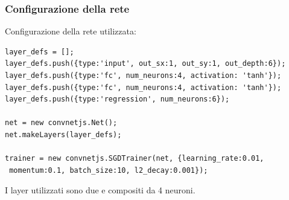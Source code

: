 \documentclass[11pt,a4paper,italian]{article}
\begin{document}
\subsubsection{Configurazione della rete}
\label{Configurazione della rete 4 neuroni per 2 layers}

Configurazione della rete utilizzata:\\
\begin{verbatim}layer_defs = [];
layer_defs.push({type:'input', out_sx:1, out_sy:1, out_depth:6});
layer_defs.push({type:'fc', num_neurons:4, activation: 'tanh'});
layer_defs.push({type:'fc', num_neurons:4, activation: 'tanh'});
layer_defs.push({type:'regression', num_neurons:6});

net = new convnetjs.Net();
net.makeLayers(layer_defs);

trainer = new convnetjs.SGDTrainer(net, {learning_rate:0.01,
 momentum:0.1, batch_size:10, l2_decay:0.001});
\end{verbatim}
\noindent
I layer utilizzati sono due e compositi da 4 neuroni.
\end{document}
